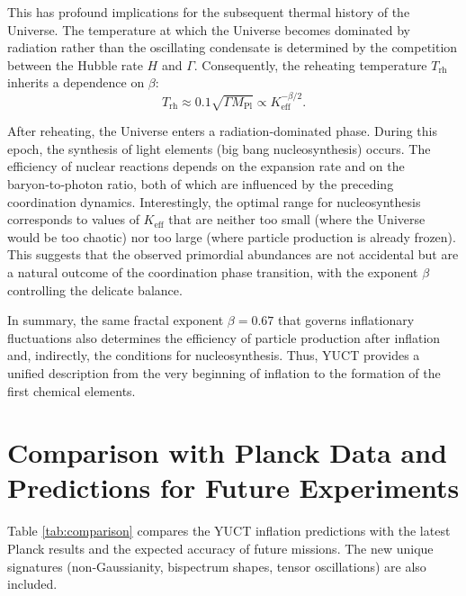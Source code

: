 \documentclass[12pt]{article}
\theoremstyle{remark}
\newcommand{\Keff}{K_{\mathrm{eff}}}
\begin{document}
	This has profound implications for the subsequent thermal history of the Universe. The temperature at which the Universe becomes dominated by radiation rather than the oscillating condensate is determined by the competition between the Hubble rate $H$ and $\Gamma$. Consequently, the reheating temperature $T_{\mathrm{rh}}$ inherits a dependence on $\beta$:
	\begin{equation}
		T_{\mathrm{rh}} \approx 0.1 \sqrt{\Gamma M_{\mathrm{Pl}}} \propto \Keff^{-\beta/2}.
		\label{eq:trh}
	\end{equation}
	
	After reheating, the Universe enters a radiation‑dominated phase. During this epoch, the synthesis of light elements (big bang nucleosynthesis) occurs. The efficiency of nuclear reactions depends on the expansion rate and on the baryon‑to‑photon ratio, both of which are influenced by the preceding coordination dynamics. Interestingly, the optimal range for nucleosynthesis corresponds to values of $\Keff$ that are neither too small (where the Universe would be too chaotic) nor too large (where particle production is already frozen). This suggests that the observed primordial abundances are not accidental but are a natural outcome of the coordination phase transition, with the exponent $\beta$ controlling the delicate balance.
	
	In summary, the same fractal exponent $\beta = 0.67$ that governs inflationary fluctuations also determines the efficiency of particle production after inflation and, indirectly, the conditions for nucleosynthesis. Thus, YUCT provides a unified description from the very beginning of inflation to the formation of the first chemical elements.
	
	\section{Comparison with Planck Data and Predictions for Future Experiments}
	\label{sec:comparison}
	
	Table \ref{tab:comparison} compares the YUCT inflation predictions with the latest Planck results and the expected accuracy of future missions. The new unique signatures (non‑Gaussianity, bispectrum shapes, tensor oscillations) are also included.
	
\end{document}
